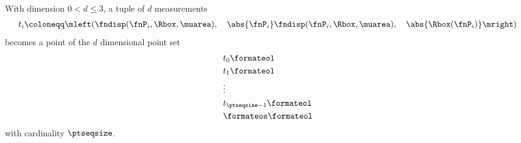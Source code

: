 With dimension $0 < d \leq 3$, a tuple of $d$ measurements
\begin{align*}
  t_i \coloneqq \mleft( \fndisp(\fnP_i, \Rbox, \muarea),\quad \abs{\fnP_i} \fndisp(\fnP_i, \Rbox, \muarea),\quad \abs{\Rbox(\fnP_i)} \mright)
\end{align*}
becomes a point of the $d$ dimensional point set
\begin{align*}
  &t_0\formateol\\
  &t_1\formateol\\
  &\vdots \\
  &t_{\ptseqsize-1}\formateol\\
  &\formateos\formateol
\end{align*}
with cardinality $\ptseqsize$.
